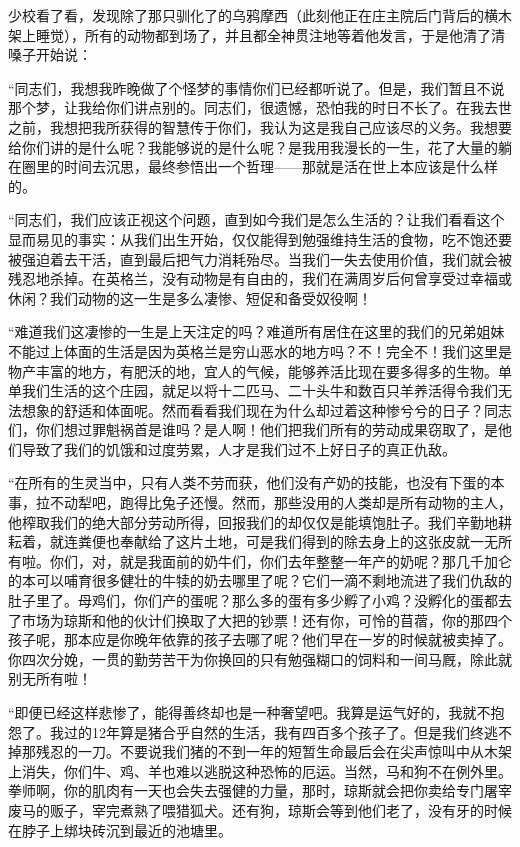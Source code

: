 少校看了看，发现除了那只驯化了的乌鸦摩西（此刻他正在庄主院后门背后的横木架上睡觉），所有的动物都到场了，并且都全神贯注地等着他发言，于是他清了清嗓子开始说：

“同志们，我想我昨晚做了个怪梦的事情你们已经都听说了。但是，我们暂且不说那个梦，让我给你们讲点别的。同志们，很遗憾，恐怕我的时日不长了。在我去世之前，我想把我所获得的智慧传于你们，我认为这是我自己应该尽的义务。我想要给你们讲的是什么呢？我能够说的是什么呢？是我用我漫长的一生，花了大量的躺在圈里的时间去沉思，最终参悟出一个哲理——那就是活在世上本应该是什么样的。

“同志们，我们应该正视这个问题，直到如今我们是怎么生活的？让我们看看这个显而易见的事实：从我们出生开始，仅仅能得到勉强维持生活的食物，吃不饱还要被强迫着去干活，直到最后把气力消耗殆尽。当我们一失去使用价值，我们就会被残忍地杀掉。在英格兰，没有动物是有自由的，我们在满周岁后何曾享受过幸福或休闲？我们动物的这一生是多么凄惨、短促和备受奴役啊！

“难道我们这凄惨的一生是上天注定的吗？难道所有居住在这里的我们的兄弟姐妹不能过上体面的生活是因为英格兰是穷山恶水的地方吗？不！完全不！我们这里是物产丰富的地方，有肥沃的地，宜人的气候，能够养活比现在要多得多的生物。单单我们生活的这个庄园，就足以将十二匹马、二十头牛和数百只羊养活得令我们无法想象的舒适和体面呢。然而看看我们现在为什么却过着这种惨兮兮的日子？同志们，你们想过罪魁祸首是谁吗？是人啊！他们把我们所有的劳动成果窃取了，是他们导致了我们的饥饿和过度劳累，人才是我们过不上好日子的真正仇敌。

“在所有的生灵当中，只有人类不劳而获，他们没有产奶的技能，也没有下蛋的本事，拉不动犁吧，跑得比兔子还慢。然而，那些没用的人类却是所有动物的主人，他榨取我们的绝大部分劳动所得，回报我们的却仅仅是能填饱肚子。我们辛勤地耕耘着，就连粪便也奉献给了这片土地，可是我们得到的除去身上的这张皮就一无所有啦。你们，对，就是我面前的奶牛们，你们去年整整一年产的奶呢？那几千加仑的本可以哺育很多健壮的牛犊的奶去哪里了呢？它们一滴不剩地流进了我们仇敌的肚子里了。母鸡们，你们产的蛋呢？那么多的蛋有多少孵了小鸡？没孵化的蛋都去了市场为琼斯和他的伙计们换取了大把的钞票！还有你，可怜的苜蓿，你的那四个孩子呢，那本应是你晚年依靠的孩子去哪了呢？他们早在一岁的时候就被卖掉了。你四次分娩，一贯的勤劳苦干为你换回的只有勉强糊口的饲料和一间马厩，除此就别无所有啦！

“即便已经这样悲惨了，能得善终却也是一种奢望吧。我算是运气好的，我就不抱怨了。我过的12年算是猪合乎自然的生活，我有四百多个孩子了。但是我们终逃不掉那残忍的一刀。不要说我们猪的不到一年的短暂生命最后会在尖声惊叫中从木架上消失，你们牛、鸡、羊也难以逃脱这种恐怖的厄运。当然，马和狗不在例外里。拳师啊，你的肌肉有一天也会失去强健的力量，那时，琼斯就会把你卖给专门屠宰废马的贩子，宰完煮熟了喂猎狐犬。还有狗，琼斯会等到他们老了，没有牙的时候在脖子上绑块砖沉到最近的池塘里。

